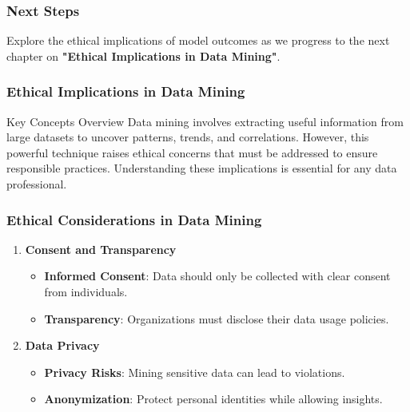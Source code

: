 \documentclass[aspectratio=169]{beamer}
\begin{document}
\begin{frame}[fragile]
  \frametitle{Next Steps}
  Explore the ethical implications of model outcomes as we progress to the next chapter on 
  \textbf{"Ethical Implications in Data Mining"}.
\end{frame}

\begin{frame}[fragile]
    \frametitle{Ethical Implications in Data Mining}
    \begin{block}{Key Concepts Overview}
        Data mining involves extracting useful information from large datasets to uncover patterns, trends, and correlations. However, this powerful technique raises ethical concerns that must be addressed to ensure responsible practices. Understanding these implications is essential for any data professional.
    \end{block}
\end{frame}

\begin{frame}[fragile]
    \frametitle{Ethical Considerations in Data Mining}
    \begin{enumerate}
        \item \textbf{Consent and Transparency}
        \begin{itemize}
            \item \textbf{Informed Consent}: Data should only be collected with clear consent from individuals.
            \item \textbf{Transparency}: Organizations must disclose their data usage policies.
        \end{itemize}

        \item \textbf{Data Privacy}
        \begin{itemize}
            \item \textbf{Privacy Risks}: Mining sensitive data can lead to violations.
            \item \textbf{Anonymization}: Protect personal identities while allowing insights.
        \end{itemize}
    \end{enumerate}
\end{frame}
\end{document}
